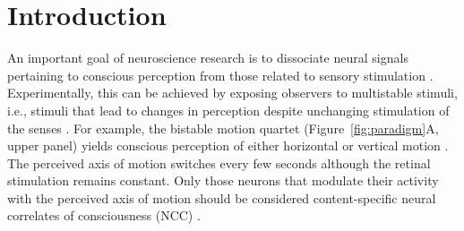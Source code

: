\section{Introduction}
An important goal of neuroscience research is to dissociate neural signals pertaining to conscious perception from those related to sensory stimulation \parencite{Logothetis1989, Rees2007}. Experimentally, this can be achieved by exposing observers to multistable stimuli, i.e., stimuli that lead to changes in perception despite unchanging stimulation of the senses \parencite{Leopold1999, Sterzer2009, Brascamp2018}. For example, the bistable motion quartet (Figure~\ref{fig:paradigm}A, upper panel) yields conscious perception of either horizontal or vertical motion \parencite{Ramachandran1985}. The perceived axis of motion switches every few seconds although the retinal stimulation remains constant. Only those neurons that modulate their activity with the perceived axis of motion should be considered content-specific neural correlates of consciousness (NCC) \parencite{Metzinger2000, Koch2016}.

